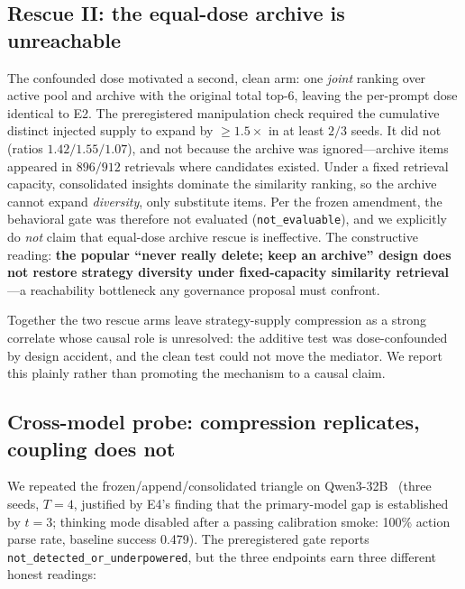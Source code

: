 \documentclass[11pt]{article}
\begin{document}
\subsection{Rescue II: the equal-dose archive is unreachable}

The confounded dose motivated a second, clean arm: one \emph{joint} ranking over active pool
and archive with the original total top-6, leaving the per-prompt dose identical to E2. The
preregistered manipulation check required the cumulative distinct injected supply to expand by
$\geq 1.5\times$ in at least $2/3$ seeds. It did not (ratios $1.42/1.55/1.07$), and not
because the archive was ignored---archive items appeared in $896/912$ retrievals where
candidates existed. Under a fixed retrieval capacity, consolidated insights dominate the
similarity ranking, so the archive cannot expand \emph{diversity}, only substitute items. Per
the frozen amendment, the behavioral gate was therefore not evaluated
(\texttt{not\_evaluable}), and we explicitly do \emph{not} claim that equal-dose archive rescue
is ineffective. The constructive reading: \textbf{the popular ``never really delete; keep an
archive'' design does not restore strategy diversity under fixed-capacity similarity
retrieval}---a reachability bottleneck any governance proposal must confront.

Together the two rescue arms leave strategy-supply compression as a strong correlate whose
causal role is unresolved: the additive test was dose-confounded by design accident, and the
clean test could not move the mediator. We report this plainly rather than promoting the
mechanism to a causal claim.

\subsection{Cross-model probe: compression replicates, coupling does not}

We repeated the frozen/append/consolidated triangle on Qwen3-32B~\citep{yang2025qwen3}
(three seeds, $T{=}4$, justified by E4's finding that the primary-model gap is established by
$t{=}3$; thinking mode disabled after a passing calibration smoke: 100\% action parse rate,
baseline success 0.479). The preregistered gate reports
\texttt{not\_detected\_or\_underpowered}, but the three endpoints earn three different honest
readings:
\end{document}
